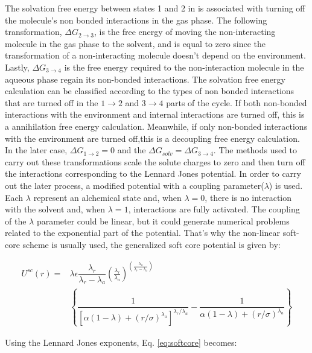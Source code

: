 The solvation free energy between states 1 and 2 in  is associated with turning off the molecule's non bonded interactions in the gas phase. The following transformation, $\Delta G_{2 \rightarrow 3}$, is the free energy of moving the non-interacting molecule in the gas phase to the solvent, and is equal to zero since the transformation of a non-interacting molecule doesn't depend on the environment. Lastly, $\Delta G_{3 \rightarrow 4}$ is the free energy required to the non-interaction molecule in the aqueous phase regain its non-bonded interactions.  The solvation free energy calculation can be classified according to the types of non bonded interactions that are turned off in the $1 \rightarrow 2$ and $ 3 \rightarrow 4$ parts of the cycle. If both non-bonded interactions with the environment and internal interactions are turned off, this is a annihilation free energy calculation. Meanwhile, if only non-bonded interactions with the environment are turned off,this is a decoupling free energy calculation. In the later case, $\Delta G_{1 \rightarrow 2} = 0$ and the $\Delta G_{solv} = \Delta G_{3 \rightarrow 4} $. The methods used to carry out these transformations scale the solute charges to zero and then turn off the interactions corresponding to the Lennard Jones potential. In order to carry out the later process, a modified potential with a coupling parameter($\lambda$) is used. Each $\lambda$ represent an alchemical state and, when $\lambda=0$, there is no interaction with the solvent and, when $\lambda=1$, interactions are fully activated. The coupling of the $\lambda$ parameter could be linear, but it could generate numerical problems related to the exponential part of the potential. That's why the non-linear soft-core scheme \cite{beutler1994} is usually used, the generalized soft core potential is given by:

\begin{equation}
\label{eq:softcore}
\begin{aligned}
U^{sc}(r) {}=& \lambda\epsilon\dfrac{\lambda_r}{\lambda_r - \lambda_a} \left(\frac{\lambda_r}{\lambda_a} \right)^{\left( \frac{\lambda_a}{\lambda_r - \lambda_a} \right)} \\
& \left\lbrace\dfrac{1}{\left[\alpha(1-\lambda)+ (r/\sigma)^{\lambda_a}\right]^{\lambda_{r}/\lambda_{a}}} - \dfrac{1}{\alpha(1-\lambda)+(r/\sigma)^{\lambda_a}}\right\rbrace
\end{aligned}
\end{equation}

Using the Lennard Jones exponents, Eq. \eqref{eq:softcore} becomes:

